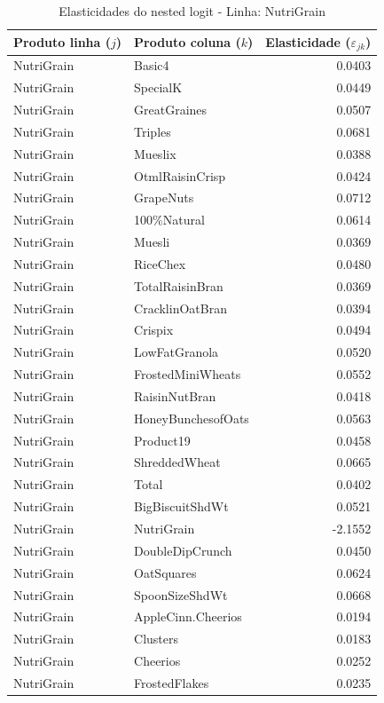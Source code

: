 \begingroup
\begin{table}[H]
\centering
\caption{Elasticidades do nested logit - Linha: NutriGrain}
\label{tab:elas-nested-nutrigrain}
\small
\begin{tabular}{llr}
\toprule
Produto linha ($j$) & Produto coluna ($k$) & Elasticidade ($\varepsilon_{jk}$) \\
\midrule
NutriGrain & Basic4 & 0.0403 \\
NutriGrain & SpecialK & 0.0449 \\
NutriGrain & GreatGraines & 0.0507 \\
NutriGrain & Triples & 0.0681 \\
NutriGrain & Mueslix & 0.0388 \\
NutriGrain & OtmlRaisinCrisp & 0.0424 \\
NutriGrain & GrapeNuts & 0.0712 \\
NutriGrain & 100\%Natural & 0.0614 \\
NutriGrain & Muesli & 0.0369 \\
NutriGrain & RiceChex & 0.0480 \\
NutriGrain & TotalRaisinBran & 0.0369 \\
NutriGrain & CracklinOatBran & 0.0394 \\
NutriGrain & Crispix & 0.0494 \\
NutriGrain & LowFatGranola & 0.0520 \\
NutriGrain & FrostedMiniWheats & 0.0552 \\
NutriGrain & RaisinNutBran & 0.0418 \\
NutriGrain & HoneyBunchesofOats & 0.0563 \\
NutriGrain & Product19 & 0.0458 \\
NutriGrain & ShreddedWheat & 0.0665 \\
NutriGrain & Total & 0.0402 \\
NutriGrain & BigBiscuitShdWt & 0.0521 \\
NutriGrain & NutriGrain & -2.1552 \\
NutriGrain & DoubleDipCrunch & 0.0450 \\
NutriGrain & OatSquares & 0.0624 \\
NutriGrain & SpoonSizeShdWt & 0.0668 \\
NutriGrain & AppleCinn.Cheerios & 0.0194 \\
NutriGrain & Clusters & 0.0183 \\
NutriGrain & Cheerios & 0.0252 \\
NutriGrain & FrostedFlakes & 0.0235 \\

\end{tabular}
\end{table}

